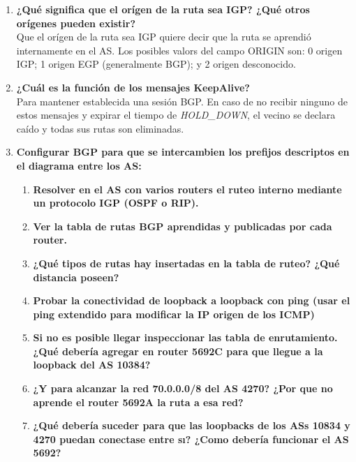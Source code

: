 \documentclass[letterpaper,12pt]{article}
\begin{document}
\begin{enumerate}
		\item \textbf{¿Qué significa que el orígen de la ruta sea IGP? ¿Qué otros orígenes pueden existir?}\\
		Que el orígen de la ruta sea IGP quiere decir que la ruta se aprendió internamente en el AS. Los posibles valors del campo ORIGIN son: 0 origen IGP; 1 origen EGP (generalmente BGP); y 2 origen desconocido. 
		\item \textbf{¿Cuál es la función de los mensajes KeepAlive?}\\
		Para mantener establecida una sesión BGP. En caso de no recibir ninguno de estos mensajes y expirar el tiempo de \textit{HOLD\_DOWN}, el vecino se declara caído y todas sus rutas son eliminadas.
		\item \textbf{Configurar BGP para que se intercambien los prefijos descriptos en el diagrama entre los AS:}
		\begin{enumerate}
			\item \textbf{Resolver en el AS con varios routers el ruteo interno mediante un protocolo IGP (OSPF o RIP).}
			\item \textbf{Ver la tabla de rutas BGP aprendidas y publicadas por cada router.}
			\item \textbf{¿Qué tipos de rutas hay insertadas en la tabla de ruteo? ¿Qué distancia poseen?}
			\item \textbf{Probar la conectividad de loopback a loopback con ping (usar el ping extendido para modificar la IP origen de los ICMP)}
			\item \textbf{Si no es posible llegar inspeccionar las tabla de enrutamiento. ¿Qué debería agregar en router 5692C para que llegue a la loopback del AS 10384?}
			\item \textbf{¿Y para alcanzar la red 70.0.0.0/8 del AS 4270? ¿Por que no aprende el router 5692A la ruta a esa red?}
			\item \textbf{¿Qué debería suceder para que las loopbacks de los ASs 10834 y 4270 puedan conectase entre sı? ¿Como debería funcionar el AS 5692?}
		\end{enumerate}
		

\end{enumerate}
\end{document}
